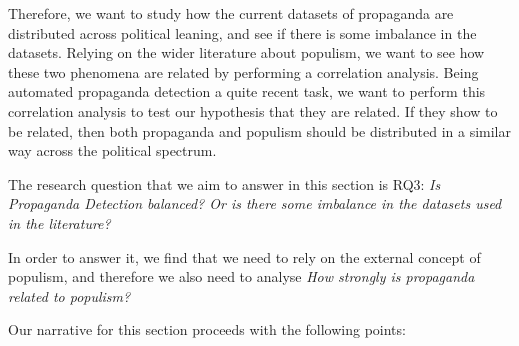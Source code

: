 Therefore, we want to study how the current datasets of propaganda are distributed across political leaning, and see if there is some imbalance in the datasets. 
Relying on the wider literature about populism, we want to see how these two phenomena are related by performing a correlation analysis.
Being automated propaganda detection a quite recent task, we want to perform this correlation analysis to test our hypothesis that they are related. 
If they show to be related, then both propaganda and populism should be distributed in a similar way across the political spectrum.




The research question that we aim to answer in this section is RQ3: \emph{Is Propaganda Detection balanced? Or is there some imbalance in the datasets used in the literature?}

In order to answer it, we find that we need to rely on the external concept of populism, and therefore we also need to analyse \emph{How strongly is propaganda related to populism?}











Our narrative for this section proceeds with the following points:

